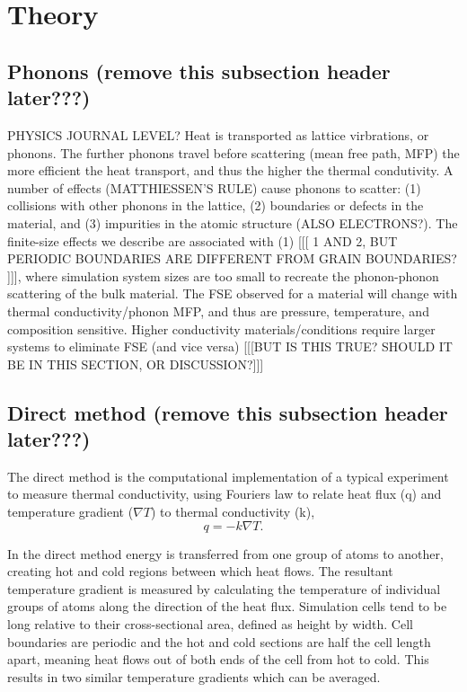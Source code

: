 \documentclass[%
preprint,                                  %
nofootinbib,
 amsmath,amssymb,
 aps,
]{revtex4-1}
\begin{document}
\section{\label{sec:theory}Theory}

\subsection{\label{sec:theory.phon}Phonons (remove this subsection header later???)}

PHYSICS JOURNAL LEVEL? 
Heat is transported as lattice virbrations, or phonons. The further phonons travel before scattering (mean free path, MFP) the more efficient the heat transport, and thus the higher the thermal condutivity. A number of effects (MATTHIESSEN'S RULE) cause phonons to scatter: (1) collisions with other phonons in the lattice, (2) boundaries or defects in the material, and (3) impurities in the atomic structure (ALSO ELECTRONS?). The finite-size effects we describe are associated with (1) [[[ 1 AND 2, BUT PERIODIC BOUNDARIES ARE DIFFERENT FROM GRAIN BOUNDARIES? ]]], where simulation system sizes are too small to recreate the phonon-phonon scattering of the bulk material. The FSE observed for a material will change with thermal conductivity/phonon MFP, and thus are pressure, temperature, and composition sensitive. Higher conductivity materials/conditions require larger systems to eliminate FSE (and vice versa) [[[BUT IS THIS TRUE? SHOULD IT BE IN THIS SECTION, OR DISCUSSION?]]]




\subsection{\label{sec:theory.direct}Direct method (remove this subsection header later???)}

The direct method is the computational implementation of a typical experiment to measure thermal conductivity, using Fourier\textsc{}s law to relate heat flux (q) and temperature gradient ($\nabla{T}$) to thermal conductivity (k), 
\begin{equation}
q=-k \nabla{T} \label{fourier}.
\end{equation}

In the direct method energy is transferred from one group of atoms to another, creating hot and cold regions between which heat flows. The resultant temperature gradient is measured by calculating the temperature of individual groups of atoms along the direction of the heat flux. Simulation cells tend to be long relative to their cross-sectional area, defined as height by width. %
Cell boundaries are periodic and the hot and cold sections are half the cell length apart, meaning heat flows out of both ends of the cell from hot to cold. This results in two similar temperature gradients which can be averaged.
\end{document}
